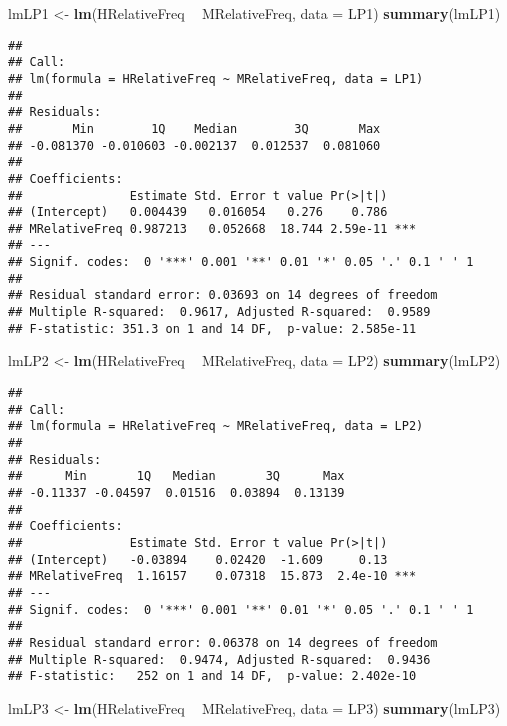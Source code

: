 \documentclass[]{article}
\newenvironment{Shaded}{\begin{snugshade}}{\end{snugshade}}
\newcommand{\DataTypeTok}[1]{\textcolor[rgb]{0.13,0.29,0.53}{#1}}
\newcommand{\KeywordTok}[1]{\textcolor[rgb]{0.13,0.29,0.53}{\textbf{#1}}}
\newcommand{\NormalTok}[1]{#1}
\newcommand{\OperatorTok}[1]{\textcolor[rgb]{0.81,0.36,0.00}{\textbf{#1}}}
\newcommand{\StringTok}[1]{\textcolor[rgb]{0.31,0.60,0.02}{#1}}
\begin{document}
\begin{Shaded}
\begin{Highlighting}[]
\NormalTok{lmLP1 <-}\StringTok{ }\KeywordTok{lm}\NormalTok{(HRelativeFreq }\OperatorTok{~}\StringTok{ }\NormalTok{MRelativeFreq, }\DataTypeTok{data =}\NormalTok{ LP1)}
\KeywordTok{summary}\NormalTok{(lmLP1)}
\end{Highlighting}
\end{Shaded}

\begin{verbatim}
## 
## Call:
## lm(formula = HRelativeFreq ~ MRelativeFreq, data = LP1)
## 
## Residuals:
##       Min        1Q    Median        3Q       Max 
## -0.081370 -0.010603 -0.002137  0.012537  0.081060 
## 
## Coefficients:
##               Estimate Std. Error t value Pr(>|t|)    
## (Intercept)   0.004439   0.016054   0.276    0.786    
## MRelativeFreq 0.987213   0.052668  18.744 2.59e-11 ***
## ---
## Signif. codes:  0 '***' 0.001 '**' 0.01 '*' 0.05 '.' 0.1 ' ' 1
## 
## Residual standard error: 0.03693 on 14 degrees of freedom
## Multiple R-squared:  0.9617, Adjusted R-squared:  0.9589 
## F-statistic: 351.3 on 1 and 14 DF,  p-value: 2.585e-11
\end{verbatim}

\begin{Shaded}
\begin{Highlighting}[]
\NormalTok{lmLP2 <-}\StringTok{ }\KeywordTok{lm}\NormalTok{(HRelativeFreq }\OperatorTok{~}\StringTok{ }\NormalTok{MRelativeFreq, }\DataTypeTok{data =}\NormalTok{ LP2)}
\KeywordTok{summary}\NormalTok{(lmLP2)}
\end{Highlighting}
\end{Shaded}

\begin{verbatim}
## 
## Call:
## lm(formula = HRelativeFreq ~ MRelativeFreq, data = LP2)
## 
## Residuals:
##      Min       1Q   Median       3Q      Max 
## -0.11337 -0.04597  0.01516  0.03894  0.13139 
## 
## Coefficients:
##               Estimate Std. Error t value Pr(>|t|)    
## (Intercept)   -0.03894    0.02420  -1.609     0.13    
## MRelativeFreq  1.16157    0.07318  15.873  2.4e-10 ***
## ---
## Signif. codes:  0 '***' 0.001 '**' 0.01 '*' 0.05 '.' 0.1 ' ' 1
## 
## Residual standard error: 0.06378 on 14 degrees of freedom
## Multiple R-squared:  0.9474, Adjusted R-squared:  0.9436 
## F-statistic:   252 on 1 and 14 DF,  p-value: 2.402e-10
\end{verbatim}

\begin{Shaded}
\begin{Highlighting}[]
\NormalTok{lmLP3 <-}\StringTok{ }\KeywordTok{lm}\NormalTok{(HRelativeFreq }\OperatorTok{~}\StringTok{ }\NormalTok{MRelativeFreq, }\DataTypeTok{data =}\NormalTok{ LP3)  }
\KeywordTok{summary}\NormalTok{(lmLP3)}
\end{Highlighting}
\end{Shaded}
\end{document}

